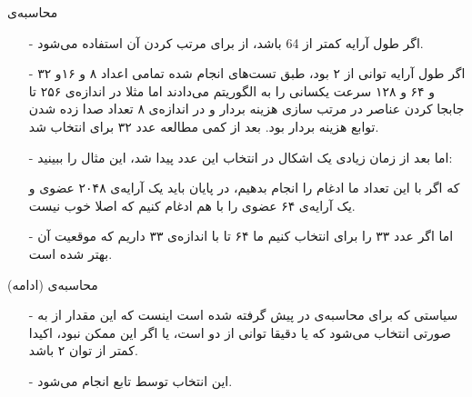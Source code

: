 \begin{frame}{محاسبه‌ی }
\begin{itemize}\itemr
\item[-]
اگر طول آرایه‌ کمتر از 64 باشد، از 
برای مرتب کردن آن استفاده می‌شود.

\item[-]
اگر طول آرایه توانی از ۲ بود، طبق تست‌های انجام شده تمامی اعداد ۸ و ۱۶و ۳۲ و ۶۴ و ۱۲۸ سرعت یکسانی را به الگوریتم می‌دادند اما مثلا در اندازه‌ی ۲۵۶ تا جابجا کردن عناصر در مرتب ‌سازی هزینه بردار و در انداز‌ه‌ی ۸ تعداد صدا زده شدن توابع هزینه‌ بردار بود. بعد از کمی مطالعه عدد ۳۲ برای  انتخاب شد.

\item[-]
اما بعد از زمان زیادی یک اشکال در انتخاب این عدد پیدا شد، این مثال را ببینید:
\begin{flushleft}
\end{flushleft}
که اگر با این تعداد  ما ادغام را انجام بدهیم، در پایان باید یک آرایه‌ی ۲۰۴۸ عضوی و یک آرایه‌ی ۶۴ عضوی را با هم ادغام کنیم که اصلا خوب نیست.

\item[-]
اما اگر عدد ۳۳ را برای  انتخاب کنیم ما ۶۴ تا  با اندازه‌ی ۳۳ داریم که موقعیت آن بهتر شده است.
\end{itemize}
\end{frame}

\begin{frame}[fragile]{محاسبه‌ی  (ادامه)}
\begin{itemize}\itemr
\item[-]
سیاستی که برای محاسبه‌ی  در پیش گرفته شده است اینست که این مقدار از  به صورتی انتخاب می‌شود که  یا دقیقا توانی از دو است، یا اگر این ممکن نبود، اکیدا کمتر از توان ۲ باشد.

\item[-]
این انتخاب توسط تابع
انجام می‌شود.
\end{itemize}
\end{frame}
